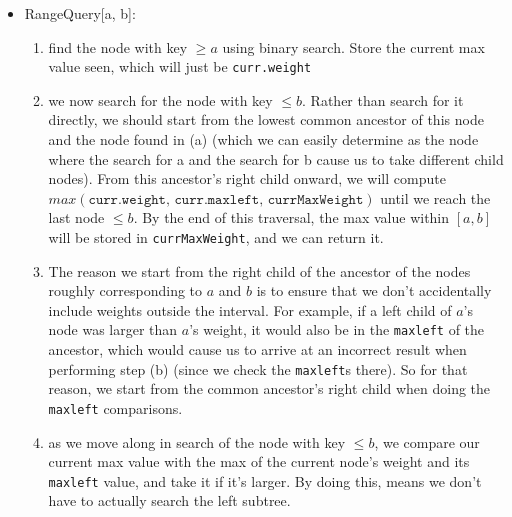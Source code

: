 \documentclass[12pt]{article}
\begin{document}
\begin{enumerate}
\begin{itemize}
        \item RangeQuery[a, b]:
        \begin{enumerate}
            \item find the node with key $\geq a$ using binary search. Store the current max value seen, which will just 
            be \texttt{curr.weight}
            \item we now search for the node with key $\leq b$. Rather than search for it directly, we should start 
            from the lowest common ancestor of this node and the node found in (a) (which we can easily determine as the node 
            where the search for a and the search for b cause us to take different child nodes). From this ancestor's 
            right child onward, we will compute $max(\texttt{curr.weight, curr.maxleft, currMaxWeight})$ until we reach the last 
            node $\leq b$. By the end of this traversal, the max value within $[a, b]$ will be stored in 
            \texttt{currMaxWeight}, and we can return it.
            \item The reason we start from the right child of the ancestor of the nodes roughly corresponding to $a$ and 
            $b$ is to ensure that we don't accidentally include weights outside the interval. For example, 
            if a left child of $a$'s node was larger than $a$'s weight, it would also be in the 
            \texttt{maxleft} of the ancestor, which would cause us to arrive at an incorrect result when performing 
            step (b) (since we check the \texttt{maxleft}s there). So for that reason, we start from the common ancestor's 
            right child when doing the \texttt{maxleft} comparisons.
            \item as we move along in search of the node with key $\leq b$, we compare our current max value with 
            the max of the current node's weight and its \texttt{maxleft} value, and take it if it's larger. By doing this, 
            means we don't have to actually search the left subtree.
        \end{enumerate}


\end{itemize}
\end{enumerate}
\end{document}
